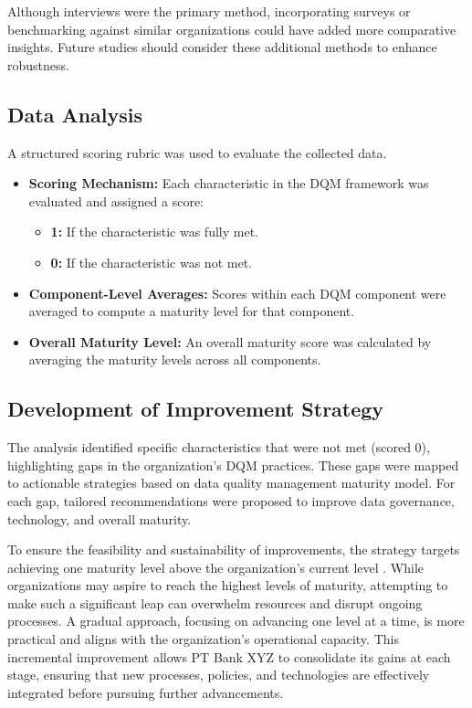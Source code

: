 \documentclass[conference]{IEEEtran}
\begin{document}
Although interviews were the primary method, incorporating surveys or benchmarking against similar organizations could have added more comparative insights. Future studies should consider these additional methods to enhance robustness.

\subsection{Data Analysis}

A structured scoring rubric was used to evaluate the collected data.

\begin{itemize}
    \item \textbf{Scoring Mechanism:} Each characteristic in the DQM framework was evaluated and assigned a score:
    \begin{itemize}
        \item \textbf{1:} If the characteristic was fully met.
        \item \textbf{0:} If the characteristic was not met.
    \end{itemize}
    \item \textbf{Component-Level Averages:} Scores within each DQM component were averaged to compute a maturity level for that component.
    \item \textbf{Overall Maturity Level:} An overall maturity score was calculated by averaging the maturity levels across all components.
\end{itemize}


\subsection{Development of Improvement Strategy}

The analysis identified specific characteristics that were not met (scored 0), highlighting gaps in the organization’s DQM practices. These gaps were mapped to actionable strategies based on \cite{loshin_dqi} data quality management maturity model. For each gap, tailored recommendations were proposed to improve data governance, technology, and overall maturity.

To ensure the feasibility and sustainability of improvements, the strategy targets achieving one maturity level above the organization’s current level \cite{loshin_dqi}. While organizations may aspire to reach the highest levels of maturity, attempting to make such a significant leap can overwhelm resources and disrupt ongoing processes. A gradual approach, focusing on advancing one level at a time, is more practical and aligns with the organization’s operational capacity. This incremental improvement allows PT Bank XYZ to consolidate its gains at each stage, ensuring that new processes, policies, and technologies are effectively integrated before pursuing further advancements.
\end{document}
